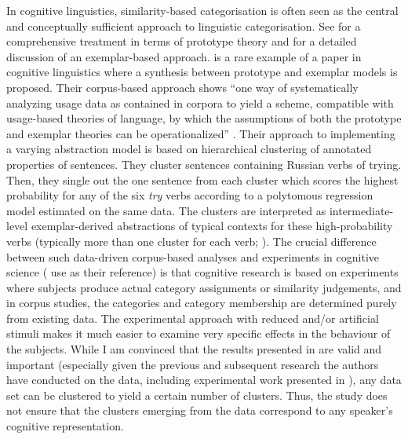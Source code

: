 In cognitive linguistics, similarity-based categorisation is often seen as the central and conceptually sufficient approach to linguistic categorisation.
See \cite{Taylor2003} for a comprehensive treatment in terms of prototype theory and \cite{Taylor2012} for a detailed discussion of an exemplar-based approach.
\cite{DivjakArppe2013} is a rare example of a paper in cognitive linguistics where a synthesis between prototype and exemplar models is proposed.
Their corpus-based approach shows ``one way of systematically analyzing usage data as contained in corpora to yield a scheme, compatible with usage-based theories of language, by which the assumptions of both the prototype and exemplar theories can be operationalized'' \citep[267]{DivjakArppe2013}.
Their approach to implementing a varying abstraction model \citep[254--260]{DivjakArppe2013} is based on hierarchical clustering of annotated properties of sentences.
They cluster sentences containing Russian verbs of trying.
Then, they single out the one sentence from each cluster which scores the highest probability for any of the six \textit{try} verbs according to a polytomous regression model estimated on the same data.
The clusters are interpreted as intermediate-level exemplar-derived abstractions of typical contexts for these high-probability verbs (typically more than one cluster for each verb; \citealp[255--256]{DivjakArppe2013}).
The crucial difference between such data-driven corpus-based analyses and experiments in cognitive science (\citealp{DivjakArppe2013} use \citealp{VerbeemenEa2007} as their reference) is that cognitive research is based on experiments where subjects produce actual category assignments or similarity judgements, and in corpus studies, the categories and category membership are determined purely from existing data.
The experimental approach with reduced and\slash or artificial stimuli makes it much easier to examine very specific effects in the behaviour of the subjects.
While I am convinced that the results presented in \citet{DivjakArppe2013} are valid and important (especially given the previous and subsequent research the authors have conducted on the data, including experimental work presented in \citealp{DivjakEa2016}), any data set can be clustered to yield a certain number of clusters.
Thus, the study does not ensure that the clusters emerging from the data correspond to any speaker's cognitive representation.

